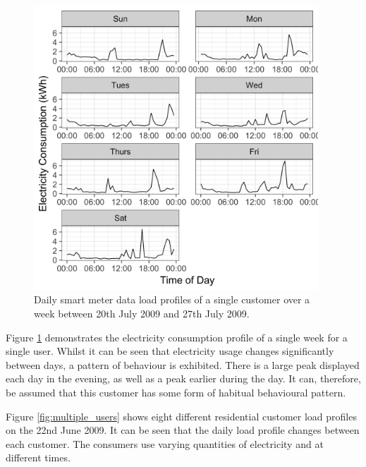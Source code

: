 \begin{figure}
	\centering
	\includegraphics[width=0.95\textwidth]{Chapter5/figures/short-term-forecasting/Rplot01.png}
	\caption{Daily smart meter data load profiles of a single customer over a week between 20th July 2009 and 27th July 2009. }
	\label{fig:single_user}
\end{figure}

Figure \ref{fig:single_user} demonstrates the electricity consumption profile of a single week for a single user. Whilst it can be seen that electricity usage changes significantly between days, a pattern of behaviour is exhibited. There is a large peak displayed each day in the evening, as well as a peak earlier during the day. It can, therefore, be assumed that this customer has some form of habitual behavioural pattern. 

Figure \ref{fig:multiple_users} shows eight different residential customer load profiles on the 22nd June 2009. It can be seen that the daily load profile changes between each customer. The consumers use varying quantities of electricity and at different times. 




